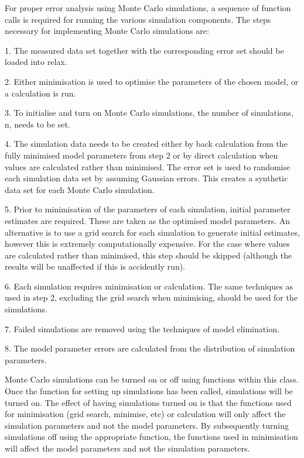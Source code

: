 For proper error analysis using Monte Carlo simulations, a sequence of function calls is
required for running the various simulation components.  The steps necessary for
implementing Monte Carlo simulations are:

1.  The measured data set together with the corresponding error set should be loaded into
relax.

2.  Either minimisation is used to optimise the parameters of the chosen model, or a
calculation is run.

3.  To initialise and turn on Monte Carlo simulations, the number of simulations, n, needs
to be set.

4.  The simulation data needs to be created either by back calculation from the fully
minimised model parameters from step 2 or by direct calculation when values are calculated
rather than minimised.  The error set is used to randomise each simulation data set by
assuming Gaussian errors.  This creates a synthetic data set for each Monte Carlo
simulation.

5.  Prior to minimisation of the parameters of each simulation, initial parameter estimates
are required.  These are taken as the optimised model parameters.  An alternative is to use
a grid search for each simulation to generate initial estimates, however this is extremely
computationally expensive.  For the case where values are calculated rather than minimised,
this step should be skipped (although the results will be unaffected if this is accidently
run).

6.  Each simulation requires minimisation or calculation.  The same techniques as used in
step 2, excluding the grid search when minimising, should be used for the simulations.

7.  Failed simulations are removed using the techniques of model elimination.

8.  The model parameter errors are calculated from the distribution of simulation
parameters.


Monte Carlo simulations can be turned on or off using functions within this class.  Once the
function for setting up simulations has been called, simulations will be turned on.  The
effect of having simulations turned on is that the functions used for minimisation (grid
search, minimise, etc) or calculation will only affect the simulation parameters and not the
model parameters.  By subsequently turning simulations off using the appropriate function,
the functions used in minimisation will affect the model parameters and not the simulation
parameters.


